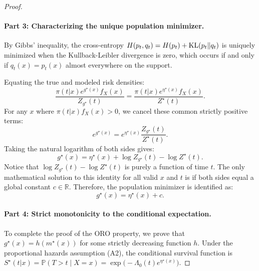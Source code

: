 \documentclass[11pt]{article}
\theoremstyle{plain}
\theoremstyle{plain}
\theoremstyle{plain}
\theoremstyle{plain}
\theoremstyle{plain}
\theoremstyle{plain}
\theoremstyle{plain}
\begin{document}
\begin{proof}
\paragraph{Part 3: Characterizing the unique population minimizer.} 
By Gibbs' inequality, the cross-entropy $H(p_t, q_t) = H(p_t) + \textup{KL}(p_t \| q_t)$ is uniquely minimized when the Kullback-Leibler divergence is zero, which occurs if and only if $q_t(x) = p_t(x)$ almost everywhere on the support. 

Equating the true and modeled risk densities:
\begin{equation}
    \frac{\pi(t|x) e^{g^\star(x)} f_X(x)}{Z_{g^\star}(t)} = \frac{\pi(t|x) e^{\eta^\star(x)} f_X(x)}{Z^\star(t)}.
\end{equation}
For any $x$ where $\pi(t|x) f_X(x) > 0$, we cancel these common strictly positive terms:
\begin{equation}
    e^{g^\star(x)} = e^{\eta^\star(x)} \frac{Z_{g^\star}(t)}{Z^\star(t)}.
\end{equation}
Taking the natural logarithm of both sides gives:
\begin{equation}
    g^\star(x) = \eta^\star(x) + \log Z_{g^\star}(t) - \log Z^\star(t).
\end{equation}
Notice that $\log Z_{g^\star}(t) - \log Z^\star(t)$ is purely a function of time $t$. The only mathematical solution to this identity for all valid $x$ and $t$ is if both sides equal a global constant $c \in \mathbb{R}$. Therefore, the population minimizer is identified as:
\begin{equation}
\label{eq:g_star_eta_app}
    g^\star(x) = \eta^\star(x) + c.
\end{equation}

\paragraph{Part 4: Strict monotonicity to the conditional expectation.} 
To complete the proof of the ORO property, we prove that $g^\star(x) = h(m^\star(x))$ for some strictly decreasing function $h$. Under the proportional hazards assumption (A2), the conditional survival function is $S^\star(t|x) = \mathbb{P}(T > t \mid X=x) = \exp\big(-\Lambda_0(t) e^{\eta^\star(x)}\big)$. 


\end{proof}
\end{document}
